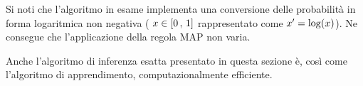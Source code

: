 \begin{nota}
Si noti che l'algoritmo in esame implementa una conversione delle probabilità in forma logaritmica non negativa (\ie{} $\mathnormal{x} \in [0\,,\,1]$ rappresentato come $\mathnormal{x}^{\prime}=\log(\mathnormal{x})$). Ne consegue che l'applicazione della regola \acs{MAP} non varia.
\end{nota}

Anche l'algoritmo di inferenza esatta presentato in questa sezione è, così come l'algoritmo di apprendimento, computazionalmente efficiente.


